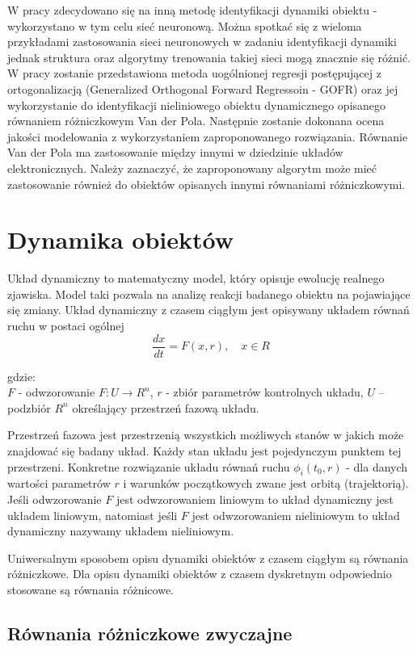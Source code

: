 	W pracy zdecydowano się na inną metodę identyfikacji dynamiki obiektu - wykorzystano w tym celu sieć neuronową. Można spotkać się z wieloma przykładami zastosowania sieci neuronowych w zadaniu identyfikacji dynamiki jednak struktura oraz algorytmy trenowania takiej sieci  mogą znacznie się różnić. W pracy zostanie przedstawiona metoda uogólnionej regresji postępującej z ortogonalizacją (Generalized Orthogonal Forward Regressoin - GOFR) oraz jej wykorzystanie do identyfikacji nieliniowego obiektu dynamicznego opisanego równaniem różniczkowym Van der Pola. Następnie zostanie dokonana ocena jakości modelowania z wykorzystaniem zaproponowanego rozwiązania. Równanie Van der Pola ma zastosowanie między innymi w dziedzinie układów elektronicznych\cite{Palczewski}. Należy zaznaczyć, że zaproponowany algorytm może mieć zastosowanie również do obiektów opisanych innymi równaniami różniczkowymi.  

\newpage
\section{Dynamika obiektów}
Układ dynamiczny to matematyczny model, który opisuje ewolucję realnego zjawiska. Model taki pozwala na analizę reakcji badanego obiektu na pojawiające się zmiany.
Układ dynamiczny z czasem ciągłym jest opisywany układem równań ruchu w postaci ogólnej\cite{Kosinski}
\begin{equation}
	\frac{dx}{dt} = F(x,r), \quad x \in R
\end{equation}

gdzie: \\
$F$ - odwzorowanie $F:U \rightarrow R^n$,
$r$ - zbiór parametrów kontrolnych układu,
$U$ – podzbiór $R^n$ określający przestrzeń fazową układu.

Przestrzeń fazowa jest przestrzenią wszystkich możliwych stanów w jakich może znajdować się badany układ. Każdy stan układu jest pojedynczym punktem tej przestrzeni. Konkretne rozwiązanie układu równań ruchu $\phi_i(t_0,r)$ - dla danych wartości parametrów $r$ i warunków początkowych zwane jest orbitą (trajektorią). Jeśli odwzorowanie $F$ jest odwzorowaniem liniowym to układ dynamiczny jest układem liniowym, natomiast jeśli $F$ jest odwzorowaniem nieliniowym to układ dynamiczny nazywamy układem nieliniowym.

Uniwersalnym sposobem opisu dynamiki obiektów z czasem ciągłym są równania różniczkowe. Dla opisu dynamiki obiektów z czasem dyskretnym odpowiednio stosowane są równania różnicowe\cite{Gutenbaum}.
\subsection{Równania różniczkowe zwyczajne}


